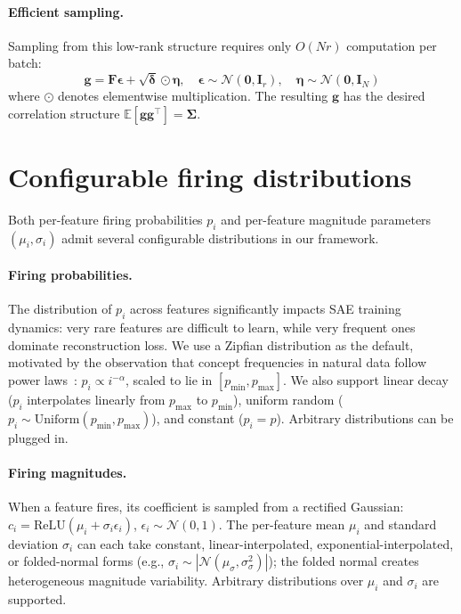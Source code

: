 \documentclass{article}
\theoremstyle{plain}
\theoremstyle{definition}
\theoremstyle{remark}
\begin{document}
\paragraph{Efficient sampling.} Sampling from this low-rank structure requires only $O(Nr)$ computation per batch:
\begin{equation}
    \mathbf{g} = \mathbf{F}\boldsymbol{\epsilon} + \sqrt{\boldsymbol{\delta}} \odot \boldsymbol{\eta}, \quad \boldsymbol{\epsilon} \sim \mathcal{N}(\mathbf{0}, \mathbf{I}_r), \quad \boldsymbol{\eta} \sim \mathcal{N}(\mathbf{0}, \mathbf{I}_N)
\end{equation}
where $\odot$ denotes elementwise multiplication. The resulting $\mathbf{g}$ has the desired correlation structure $\mathbb{E}[\mathbf{g}\mathbf{g}^\top] = \boldsymbol{\Sigma}$.

\section{Configurable firing distributions}
\label{apx:firing-dists}

Both per-feature firing probabilities $p_i$ and per-feature magnitude parameters $(\mu_i, \sigma_i)$ admit several configurable distributions in our framework.

\paragraph{Firing probabilities.} The distribution of $p_i$ across features significantly impacts SAE training dynamics: very rare features are difficult to learn, while very frequent ones dominate reconstruction loss. We use a Zipfian distribution as the default, motivated by the observation that concept frequencies in natural data follow power laws~\citep{piantadosi2014zipf,ayonrinde2024adaptive,michaud2023quantization}: $p_i \propto i^{-\alpha}$, scaled to lie in $[p_{\min}, p_{\max}]$. We also support linear decay ($p_i$ interpolates linearly from $p_{\max}$ to $p_{\min}$), uniform random ($p_i \sim \text{Uniform}(p_{\min}, p_{\max})$), and constant ($p_i = p$). Arbitrary distributions can be plugged in.

\paragraph{Firing magnitudes.} When a feature fires, its coefficient is sampled from a rectified Gaussian: $c_i = \text{ReLU}(\mu_i + \sigma_i \epsilon_i)$, $\epsilon_i \sim \mathcal{N}(0,1)$. The per-feature mean $\mu_i$ and standard deviation $\sigma_i$ can each take constant, linear-interpolated, exponential-interpolated, or folded-normal forms (e.g., $\sigma_i \sim |\mathcal{N}(\mu_\sigma, \sigma_\sigma^2)|$); the folded normal creates heterogeneous magnitude variability. Arbitrary distributions over $\mu_i$ and $\sigma_i$ are supported.
\end{document}
